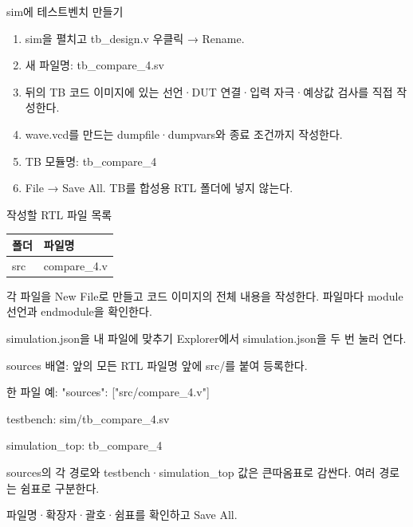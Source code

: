 \begin{frame}{sim에 테스트벤치 만들기}\relax
\small
\begin{enumerate}\setlength{\itemsep}{0.22cm}
\item sim을 펼치고 tb\_design.v 우클릭 → Rename.
\item 새 파일명: tb\_compare\_4.sv
\item 뒤의 TB 코드 이미지에 있는 선언·DUT 연결·입력 자극·예상값 검사를 직접 작성한다.
\item wave.vcd를 만드는 dumpfile·dumpvars와 종료 조건까지 작성한다.
\item TB 모듈명: tb\_compare\_4
\item File → Save All. TB를 합성용 RTL 폴더에 넣지 않는다.
\end{enumerate}

\end{frame}

\begin{frame}{작성할 RTL 파일 목록}\relax
\small
\begin{center}\renewcommand{\arraystretch}{1.45}
\begin{tabular}{l|l}
폴더 & 파일명\\\hline
src & compare\_4.v\\
\end{tabular}\end{center}
각 파일을 New File로 만들고 코드 이미지의 전체 내용을 작성한다. 파일마다 module 선언과 endmodule을 확인한다.\par
\end{frame}

\begin{frame}{simulation.json을 내 파일에 맞추기}\relax
\small
Explorer에서 simulation.json을 두 번 눌러 연다.\par\vspace{0.22cm}sources 배열: 앞의 모든 RTL 파일명 앞에 src/를 붙여 등록한다.\par\vspace{0.22cm}한 파일 예: "sources": ["src/compare\_4.v"]\par\vspace{0.22cm}testbench: sim/tb\_compare\_4.sv\par\vspace{0.22cm}simulation\_top: tb\_compare\_4\par\vspace{0.22cm}sources의 각 경로와 testbench·simulation\_top 값은 큰따옴표로 감싼다. 여러 경로는 쉼표로 구분한다.\par\vspace{0.22cm}파일명·확장자·괄호·쉼표를 확인하고 Save All.\par
\end{frame}

